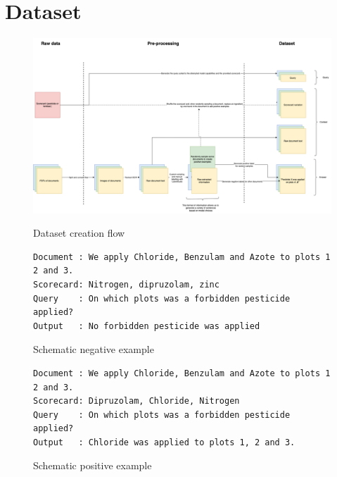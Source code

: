 \documentclass[11pt]{article}
\begin{document}
\section{Dataset}

\begin{figure}[btp]
    \centering
    \includegraphics[width=1\linewidth]{DataPreprocessing.png}
    \caption{Dataset creation flow}
    \label{fig:enter-label}

\begin{verbatim}
Document : We apply Chloride, Benzulam and Azote to plots 1 2 and 3.
Scorecard: Nitrogen, dipruzolam, zinc
Query    : On which plots was a forbidden pesticide applied?
Output   : No forbidden pesticide was applied
\end{verbatim}
\caption{Schematic negative example}

\begin{verbatim}
Document : We apply Chloride, Benzulam and Azote to plots 1 2 and 3. 
Scorecard: Dipruzolam, Chloride, Nitrogen
Query    : On which plots was a forbidden pesticide applied?
Output   : Chloride was applied to plots 1, 2 and 3.
\end{verbatim}
\caption{Schematic positive example}
\end{figure}
\end{document}
